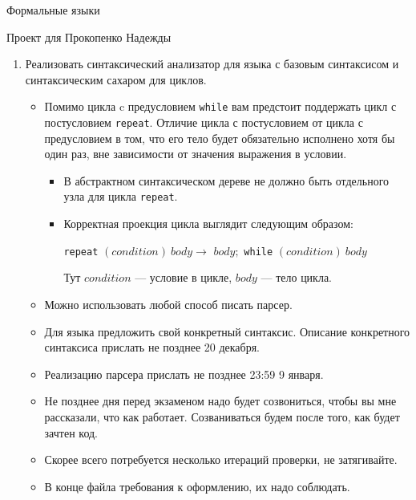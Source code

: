 \documentclass[12pt]{article}
\begin{document}
\begin{center}
{\LARGE Формальные языки}

{\Large Проект для Прокопенко Надежды}

\end{center}

\bigskip

\begin{enumerate}
  \item {Реализовать синтаксический анализатор для языка с базовым синтаксисом и синтаксическим сахаром для циклов. }
  \begin{itemize}
    \item Помимо цикла c предусловием \verb!while! вам предстоит поддержать цикл с постусловием \verb!repeat!. Отличие цикла с постусловием от цикла с предусловием в том, что его тело будет обязательно исполнено хотя бы один раз, вне зависимости от значения выражения в условии.
    \begin{itemize}
      \item В абстрактном синтаксическом дереве не должно быть отдельного узла для цикла \verb!repeat!.
      \item Корректная проекция цикла выглядит следующим образом:

      \verb!repeat! $(condition) \ body \to $ $body;$ \verb!while! $(condition) \ body$

      Тут $condition$ --- условие в цикле, $body$ --- тело цикла.
    \end{itemize}
    \item Можно использовать любой способ писать парсер.
    \item Для языка предложить свой конкретный синтаксис. Описание конкретного синтаксиса прислать не позднее 20 декабря.
    \item Реализацию парсера прислать не позднее 23:59 9 января.
    \item Не позднее дня перед экзаменом надо будет созвониться, чтобы вы мне рассказали, что как работает. Созваниваться будем после того, как будет зачтен код.
    \item Скорее всего потребуется несколько итераций проверки, не затягивайте.
    \item В конце файла требования к оформлению, их надо соблюдать.
  \end{itemize}

\end{enumerate}



\bigskip


\end{document}
